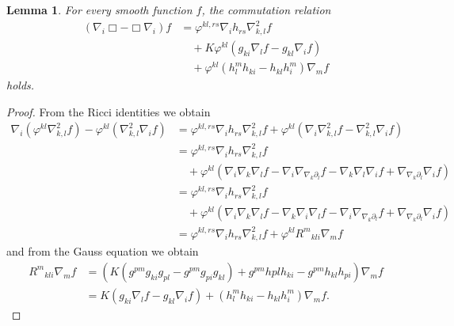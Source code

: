 \documentclass{amsart}
\newtheorem{lemma}[theorem]{Lemma}
\theoremstyle{definition}
\theoremstyle{remark}
\numberwithin{equation}{section}
\begin{document}
\begin{lemma}
\label{lem:gradBox}
For every smooth function $f$, the commutation relation
\[
\begin{split}
(\nabla_i \Box -\Box \nabla_i) f &= \varphi^{kl,rs} \nabla_i h_{rs} \nabla^2_{k,l} f \\
&\quad + K \varphi^{kl} \left(g_{ki} \nabla_l f - g_{kl} \nabla_i f\right) \\
&\quad + \varphi^{kl}\left(h^{m}_{l}h_{ki} - h_{kl}h^{m}_{i}\right) \nabla_m f
\end{split}
\]
holds.
\end{lemma}

\begin{proof}
From the Ricci identities we obtain
\[
\begin{split}
\nabla_i (\varphi^{kl} \nabla^2_{k,l} f) - \varphi^{kl}(\nabla^2_{k,l} \nabla_i f) &= \varphi^{kl,rs} \nabla_i h_{rs} \nabla^2_{k,l}f + \varphi^{kl}(\nabla_i \nabla^2_{k,l} f - \nabla^2_{k,l} \nabla_i f)  \\
&= \varphi^{kl,rs} \nabla_i h_{rs} \nabla^2_{k,l}f \\
& \quad + \varphi^{kl}(\nabla_i \nabla_k \nabla_l f - \nabla_i \nabla_{\nabla_k \partial_l} f - \nabla_k \nabla_l \nabla_i f + \nabla_{\nabla_k \partial_l} \nabla_i f) \\
&= \varphi^{kl,rs} \nabla_i h_{rs} \nabla^2_{k,l}f \\
&\quad + \varphi^{kl}(\nabla_i \nabla_k \nabla_l f - \nabla_k \nabla_i \nabla_l f - \nabla_i \nabla_{\nabla_k \partial_l} f  + \nabla_{\nabla_k \partial_l} \nabla_i f) \\
&= \varphi^{kl,rs} \nabla_i h_{rs} \nabla^2_{k,l}f + \varphi^{kl}{R^{m}}_{kli} \nabla_m f
\end{split}
\]
and from the Gauss equation we obtain
\[
\begin{split}
{R^{m}}_{kli} \nabla_m f &= \left(K\left(g^{pm}g_{ki}g_{pl}  - g^{pm}g_{pi}g_{kl}\right) + g^{pm} h{pl}h_{ki} - g^{pm}h_{kl}h_{pi}\right) \nabla_m f \\
&= K\left(g_{ki} \nabla_l f - g_{kl} \nabla_i f\right) + \left(h^{m}_{l}h_{ki} - h_{kl}h^{m}_{i}\right) \nabla_m f.
\end{split}
\]
\end{proof}


\end{document}
